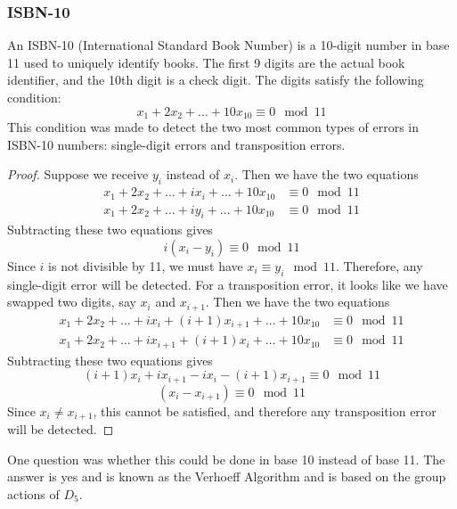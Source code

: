 \documentclass{article}
\theoremstyle{definition}
\begin{document}
\subsubsection{ISBN-10}
An ISBN-10 (International Standard Book Number) is a 10-digit number in base 11 used to uniquely identify books. The first 9 digits are the actual book identifier, and the 10th digit is a check digit. The digits satisfy the following condition:
\begin{equation*}
    x_1 + 2x_2 +\ldots + 10x_{10} \equiv 0 \mod{11}
\end{equation*}
This condition was made to detect the two most common types of errors in ISBN-10 numbers: single-digit errors and transposition errors.
\begin{proof}
Suppose we receive $y_i$ instead of $x_i$. Then we have the two equations 
\begin{align*}
    x_1 +2x_2+\ldots + ix_i +\ldots + 10x_{10} &\equiv 0 \mod{11}\\
    x_1+2x_2+\ldots + iy_i +\ldots + 10x_{10} &\equiv 0 \mod{11}
\end{align*}
Subtracting these two equations gives
\begin{equation*}
    i(x_i - y_i) \equiv 0 \mod{11}
\end{equation*}
Since $i$ is not divisible by 11, we must have $x_i \equiv y_i \mod{11}$. Therefore, any single-digit error will be detected. For a transposition error, it looks like we have swapped two digits, say $x_i$ and $x_{i+1}$. Then we have the two equations
\begin{align*}
    x_1 +2x_2+\ldots + ix_i + (i+1)x_{i+1} +\ldots + 10x_{10} &\equiv 0 \mod{11}\\
    x_1 +2x_2+\ldots + ix_{i+1} + (i+1)x_i +\ldots + 10x_{10} &\equiv 0 \mod{11}
\end{align*}
Subtracting these two equations gives
\begin{equation*}
    (i+1)x_i + ix_{i+1} - ix_i - (i+1)x_{i+1} \equiv 0 \mod{11}
\end{equation*}
\begin{equation*}
    (x_i - x_{i+1}) \equiv 0 \mod{11}
\end{equation*}
Since $x_i \neq x_{i+1}$, this cannot be satisfied, and therefore any transposition error will be detected.
\end{proof}
One question was whether this could be done in base 10 instead of base 11. The answer is yes and is known as the Verhoeff Algorithm and is based on the group actions of $D_5$. 
\end{document}
